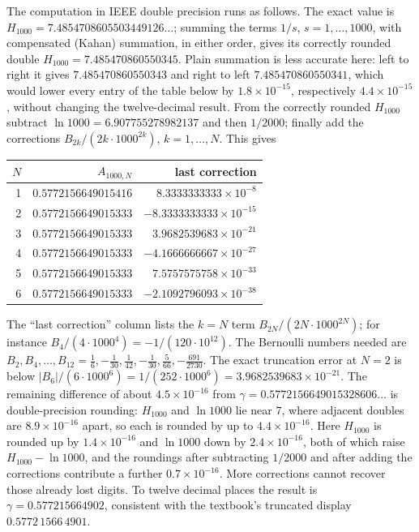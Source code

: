 The computation in IEEE double precision runs as follows. The exact value
is $H_{1000}=7.4854708605503449126\ldots$; summing the terms $1/s$,
$s=1,\ldots,1000$, with compensated (Kahan) summation, in either order,
gives its correctly rounded double $H_{1000}=7.485470860550345$. Plain
summation is less accurate here: left to right it gives
$7.485470860550343$ and right to left $7.485470860550341$, which would
lower every entry of the table below by $1.8\times10^{-15}$, respectively
$4.4\times10^{-15}$, without changing the twelve-decimal result. From the
correctly rounded $H_{1000}$ subtract $\ln1000=6.907755278982137$ and then
$1/2000$; finally add the corrections $B_{2k}/(2k\cdot1000^{2k})$,
$k=1,\ldots,N$. This gives
\begin{center}
\begin{tabular}{rrr}\toprule
$N$&$A_{1000,N}$&last correction\\\midrule
1&$0.5772156649015416$&$8.3333333333\times10^{-8}$\\
2&$0.5772156649015333$&$-8.3333333333\times10^{-15}$\\
3&$0.5772156649015333$&$3.9682539683\times10^{-21}$\\
4&$0.5772156649015333$&$-4.1666666667\times10^{-27}$\\
5&$0.5772156649015333$&$7.5757575758\times10^{-33}$\\
6&$0.5772156649015333$&$-2.1092796093\times10^{-38}$\\
\bottomrule\end{tabular}\end{center}
The ``last correction'' column lists the $k=N$ term
$B_{2N}/(2N\cdot1000^{2N})$; for instance $B_4/(4\cdot1000^4)
=-1/(120\cdot10^{12})$. The Bernoulli numbers needed are
$B_2,B_4,\ldots,B_{12}=\frac16,-\frac1{30},\frac1{42},-\frac1{30},
\frac5{66},-\frac{691}{2730}$.
The exact truncation error at $N=2$ is below
$|B_6|/(6\cdot1000^6)=1/(252\cdot1000^6)=3.9682539683\times10^{-21}$.
The remaining difference of about $4.5\times10^{-16}$ from
$\gamma=0.5772156649015328606\ldots$ is double-precision rounding:
$H_{1000}$ and $\ln1000$ lie near $7$, where adjacent doubles are
$8.9\times10^{-16}$ apart, so each is rounded by up to
$4.4\times10^{-16}$. Here $H_{1000}$ is rounded up by
$1.4\times10^{-16}$ and $\ln1000$ down by $2.4\times10^{-16}$, both of
which raise $H_{1000}-\ln1000$, and the roundings after subtracting
$1/2000$ and after adding the corrections contribute a further
$0.7\times10^{-16}$. More corrections cannot recover
those already lost digits. To twelve decimal places the result is
$\boxed{\gamma=0.577215664902}$, consistent with the textbook's
truncated display $0.5772\,1566\,4901$.

